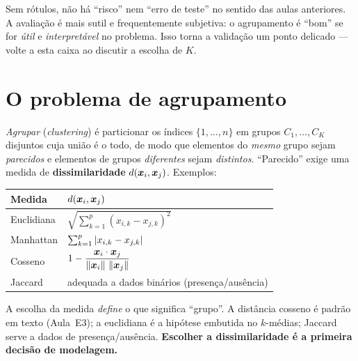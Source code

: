 \documentclass[11pt,a4paper]{article}
\begin{document}
\begin{atencao}
Sem rótulos, não há ``risco'' nem ``erro de teste'' no sentido das aulas anteriores.
A avaliação é mais sutil e frequentemente subjetiva: o agrupamento é ``bom'' se for
\emph{útil} e \emph{interpretável} no problema. Isso torna a validação um ponto
delicado --- volte a esta caixa ao discutir a escolha de $K$.
\end{atencao}

\section{O problema de agrupamento}
\emph{Agrupar} (\emph{clustering}) é particionar os índices $\{1,\dots,n\}$ em
grupos $C_1,\dots,C_K$ disjuntos cuja união é o todo, de modo que elementos do
\emph{mesmo} grupo sejam \emph{parecidos} e elementos de grupos \emph{diferentes}
sejam \emph{distintos}. ``Parecido'' exige uma medida de \textbf{dissimilaridade}
$d(\bm{x}_i,\bm{x}_j)$. Exemplos:
\begin{center}\small
\renewcommand{\arraystretch}{1.5}
\begin{tabular}{@{}ll@{}}
\toprule
\textbf{Medida} & \textbf{$d(\bm{x}_i,\bm{x}_j)$} \\
\midrule
Euclidiana   & $\sqrt{\sum_{k=1}^p (x_{i,k}-x_{j,k})^2}$ \\
Manhattan    & $\sum_{k=1}^p \left\lvert x_{i,k}-x_{j,k} \right\rvert$ \\
Cosseno      & $1-\dfrac{\bm{x}_i\cdot\bm{x}_j}{\left\lVert \bm{x}_i \right\rVert\,\left\lVert \bm{x}_j \right\rVert}$ \\
Jaccard      & adequada a dados binários (presença/ausência) \\
\bottomrule
\end{tabular}
\end{center}

\begin{ideia}
A escolha da medida \emph{define} o que significa ``grupo''. A distância cosseno é
padrão em texto (Aula~E3); a euclidiana é a hipótese embutida no $k$-médias; Jaccard
serve a dados de presença/ausência. \textbf{Escolher a dissimilaridade é a primeira
decisão de modelagem.}
\end{ideia}

\end{document}
